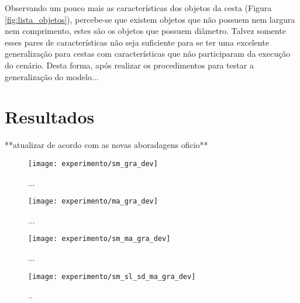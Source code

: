 Observando um pouco mais as características dos objetos da cesta (Figura \ref{fig:lista_objetos}), percebe-se que existem objetos que não possuem nem largura nem comprimento, estes são os objetos que possuem diâmetro. Talvez somente esses pares de características não seja suficiente para se ter uma excelente generalização para cestas com características que não participaram da execução do cenário. Desta forma, após realizar os procedimentos para testar a generalização do modelo... 

\section{Resultados} **atualizar de acordo com as novas aboradagens oficio**

\begin{figure}[!htb] \centering 
  \centering
  \texttt{[image: experimento/sm\_gra\_dev]} 
  \caption{... } 
  \label{fig:sm_gra_dev}
\end{figure}

\begin{figure}[!htb] \centering 
  \centering
  \texttt{[image: experimento/ma\_gra\_dev]} 
  \caption{...} 
  \label{fig:ma_gra_dev}
\end{figure}

\begin{figure}[!htb] \centering 
  \centering
  \texttt{[image: experimento/sm\_ma\_gra\_dev]} 
  \caption{...} 
  \label{fig:sm_ma_gra_dev}
\end{figure}

\begin{figure}[!htb] \centering 
  \centering
  \texttt{[image: experimento/sm\_sl\_sd\_ma\_gra\_dev]} 
  \caption{.. } 
  \label{fig:sm_sl_sd_ma_gra_dev}
\end{figure}

 


